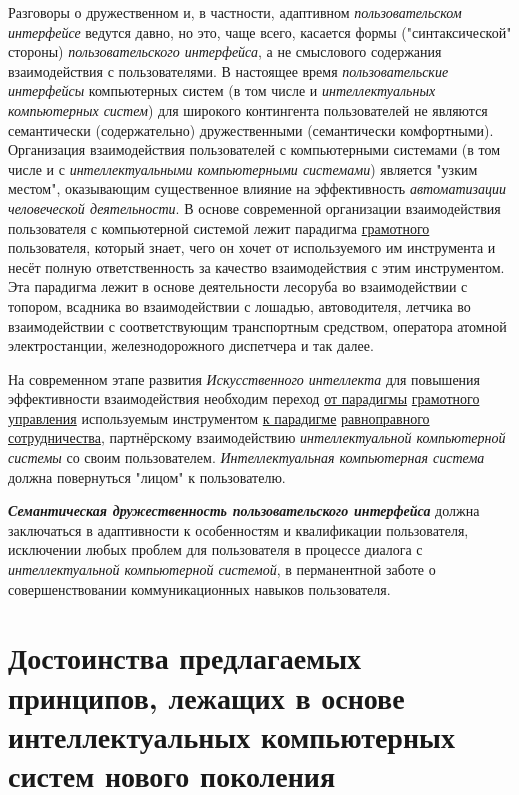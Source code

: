 Разговоры о дружественном и, в частности, адаптивном \textit{пользовательском интерфейсе} ведутся давно, но это, чаще всего, касается формы ("синтаксической" стороны) \textit{пользовательского интерфейса}, а не смыслового содержания взаимодействия с пользователями. В настоящее время \textit{пользовательские интерфейсы} компьютерных систем (в том числе и \textit{интеллектуальных компьютерных систем}) для широкого контингента пользователей не являются семантически (содержательно) дружественными (семантически комфортными). Организация взаимодействия пользователей с компьютерными системами (в том числе и с \textit{интеллектуальными компьютерными системами}) является "узким местом"{}, оказывающим существенное влияние на эффективность \textit{автоматизации человеческой деятельности}. В основе современной организации взаимодействия пользователя с компьютерной системой лежит парадигма \underline{грамотного} пользователя, который знает, чего он хочет от используемого им инструмента и несёт полную ответственность за качество взаимодействия с этим инструментом. Эта парадигма лежит в основе деятельности лесоруба во взаимодействии с топором, всадника во взаимодействии с лошадью, автоводителя, летчика во взаимодействии с соответствующим транспортным средством, оператора атомной электростанции, железнодорожного диспетчера и так далее.

На современном этапе развития \textit{Искусственного интеллекта} для повышения эффективности взаимодействия необходим переход \underline{от парадигмы} \underline{грамотного} \underline{управления} используемым инструментом \underline{к парадигме} \underline{равноправного} \underline{сотрудничества}, партнёрскому взаимодействию \textit{интеллектуальной компьютерной системы} со своим пользователем. \textit{Интеллектуальная компьютерная система} должна повернуться "лицом"{} к пользователю.

\textbf{\textit{Семантическая дружественность пользовательского интерфейса}} должна заключаться в адаптивности к особенностям и квалификации пользователя, исключении любых проблем для пользователя в процессе диалога с \textit{интеллектуальной компьютерной системой}, в перманентной заботе о совершенствовании коммуникационных навыков пользователя.

\section{Достоинства предлагаемых принципов, лежащих в основе интеллектуальных компьютерных систем нового поколения}
\label{sec_ngics_advant}


